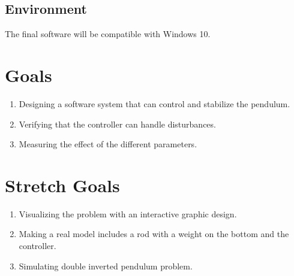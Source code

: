 \documentclass{article}
\begin{document}
\subsection{Environment}

The final software will be compatible with Windows 10.

\section{Goals}

\begin{enumerate}
  \item	Designing a software system that can control and stabilize the pendulum.
  \item Verifying that the controller can handle disturbances.
  \item	Measuring the effect of the different parameters.
\end{enumerate}
\section{Stretch Goals}
\begin{enumerate}
  \item Visualizing the problem with an interactive graphic design.
  \item Making a real model includes a rod with a weight on the bottom and the controller.
  \item Simulating double inverted pendulum problem.
\end{enumerate}
\end{document}
